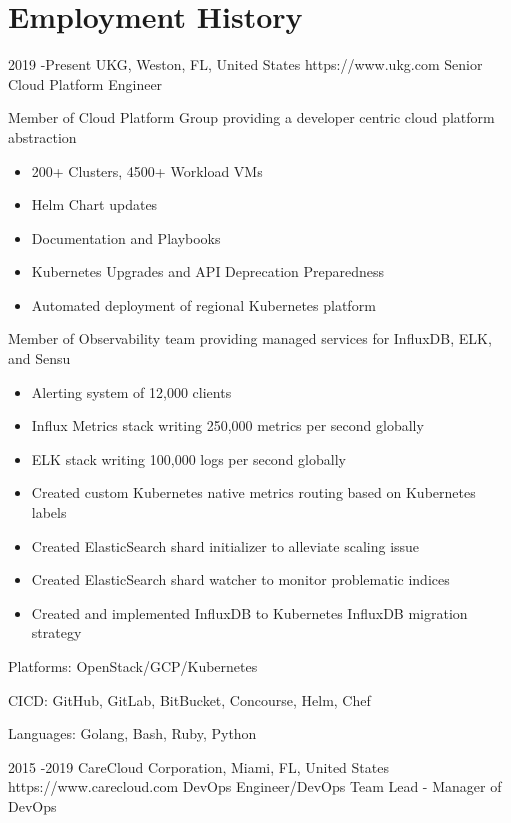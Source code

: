 \documentclass[10pt]{article} %
\begin{document}
\section{Employment History}
\job
{2019 -}{Present}
{UKG, Weston, FL, United States}
{https://www.ukg.com}
{Senior Cloud Platform Engineer}
{\begin{itemize-noindent}
\item{Member of Cloud Platform Group providing a developer centric cloud platform abstraction}
  \begin{itemize}
    \item{200+ Clusters, 4500+ Workload VMs}
    \item{Helm Chart updates}
    \item{Documentation and Playbooks}
    \item{Kubernetes Upgrades and API Deprecation Preparedness}
    \item{Automated deployment of regional Kubernetes platform}
  \end{itemize}
\item{Member of Observability team providing managed services for InfluxDB, ELK, and Sensu}
  \begin{itemize}
    \item{Alerting system of 12,000 clients}
    \item{Influx Metrics stack writing 250,000 metrics per second globally}
    \item{ELK stack writing 100,000 logs per second globally}
    \item{Created custom Kubernetes native metrics routing based on Kubernetes labels}
    \item{Created ElasticSearch shard initializer to alleviate scaling issue}
    \item{Created ElasticSearch shard watcher to monitor problematic indices}
    \item{Created and implemented InfluxDB to Kubernetes InfluxDB migration strategy}
  \end{itemize}
\item{Platforms: OpenStack/GCP/Kubernetes}
\item{CICD: GitHub, GitLab, BitBucket, Concourse, Helm, Chef}
\item{Languages: Golang, Bash, Ruby, Python}
\end{itemize-noindent}}
\job
{2015 -}{2019}
{CareCloud Corporation, Miami, FL, United States}
{https://www.carecloud.com}
{DevOps Engineer/DevOps Team Lead - Manager of DevOps}
\end{document}
